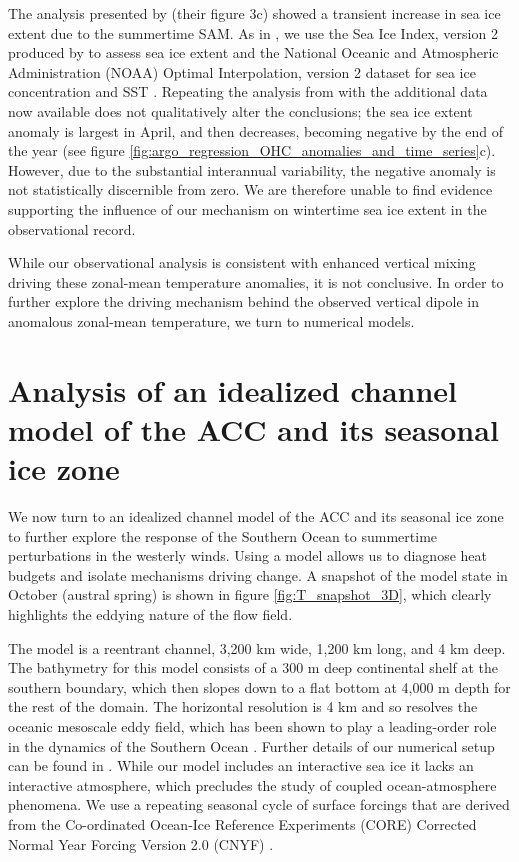 \documentclass{ametsocV5}
\begin{document}
The analysis presented by \citet{Doddridge2017} (their figure 3c) showed a transient increase in sea ice extent due to the summertime SAM. As in \citet{Doddridge2017}, we use the Sea Ice Index, version 2 produced by \citet{Fetterer2016} to assess sea ice extent and the National Oceanic and Atmospheric Administration (NOAA) Optimal Interpolation, version 2 dataset for sea ice concentration and SST \citep{Reynolds2002}. Repeating the analysis from \citet{Doddridge2017} with the additional data now available does not qualitatively alter the conclusions; the sea ice extent anomaly is largest in April, and then decreases, becoming negative by the end of the year (see figure \ref{fig:argo_regression_OHC_anomalies_and_time_series}c). However, due to the substantial interannual variability, the negative anomaly is not statistically discernible from zero. We are therefore unable to find evidence supporting the influence of our mechanism on wintertime sea ice extent in the observational record.

While our observational analysis is consistent with enhanced vertical mixing driving these zonal-mean temperature anomalies, it is not conclusive. In order to further explore the driving mechanism behind the observed vertical dipole in anomalous zonal-mean temperature, we turn to numerical models.




\section{Analysis of an idealized channel model of the ACC and its seasonal ice zone} %
\label{sec:analysis_of_an_idealised_channel_model}

We now turn to an idealized channel model of the ACC and its seasonal ice zone to further explore the response of the Southern Ocean to summertime perturbations in the westerly winds. Using a model allows us to diagnose heat budgets and isolate mechanisms driving change.  A snapshot of the model state in October (austral spring) is shown in figure \ref{fig:T_snapshot_3D}, which clearly highlights the eddying nature of the flow field.

The model is a reentrant channel, 3,200 km wide, 1,200 km long, and 4 km deep. The bathymetry for this model consists of a 300 m deep continental shelf at the southern boundary, which then slopes down to a flat bottom at 4,000 m depth for the rest of the domain. The horizontal resolution is 4 km and so resolves the oceanic mesoscale eddy field, which has been shown to play a leading-order role in the dynamics of the Southern Ocean \citep[see e.g.][]{Marshall2003,Marshall2012b,Munday2013}. Further details of our numerical setup can be found in \citet{Doddridge2019a}. While our model includes an interactive sea ice \citep{Losch2010} it lacks an interactive atmosphere, which precludes the study of coupled ocean-atmosphere phenomena. We use a repeating seasonal cycle of surface forcings that are derived from the Co-ordinated Ocean-Ice Reference Experiments (CORE) Corrected Normal Year Forcing Version 2.0 (CNYF) \citep{Large2004}.
\end{document}
